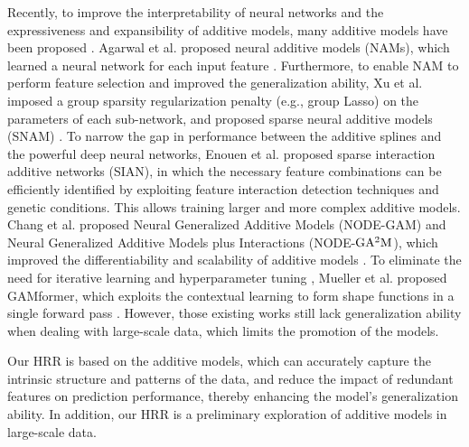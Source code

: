 Recently, to improve the interpretability of neural networks and the expressiveness and expansibility of additive models, many additive models have been proposed \cite{mueller2024gamformer,xu2023sparse,Chang22,enouen2022sparse,Agarwal21}.  Agarwal et al. proposed neural additive models (NAMs), which learned a neural network for each input feature \cite{Agarwal21}.  Furthermore,  to enable NAM to perform feature selection and improved the generalization ability, Xu et al. imposed a group sparsity regularization penalty (e.g., group Lasso) on the parameters of each sub-network, and proposed sparse neural additive models (SNAM) \cite{xu2023sparse}.  To narrow the gap in performance between the additive splines and the powerful deep neural networks, Enouen et al. \cite{enouen2022sparse}  proposed sparse interaction additive networks (SIAN), in which the necessary feature combinations can be efficiently identified by exploiting feature interaction detection techniques and genetic conditions. This allows training larger and more complex additive models.  Chang et al.  proposed Neural Generalized Additive Models (NODE-GAM) and Neural Generalized Additive Models plus Interactions (NODE-$\rm{GA^2M}$),  which improved the differentiability and scalability of additive models \cite{Chang22}. To eliminate the need for iterative learning and hyperparameter tuning , Mueller et al. proposed GAMformer,  which exploits the contextual learning to form shape functions in a single forward pass \cite{mueller2024gamformer}. However, those existing works still lack generalization ability when dealing with large-scale data, which limits the promotion of the models.


Our HRR is based on the additive models, which can accurately capture the intrinsic structure and patterns of the data, and reduce the impact of redundant features on prediction performance, thereby enhancing the model's generalization ability. In addition, our HRR is a preliminary exploration of additive models in large-scale data.